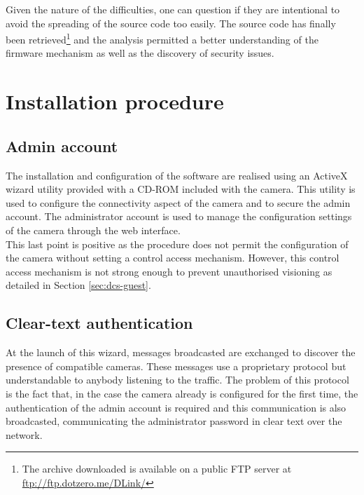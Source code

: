 Given the nature of the difficulties, one can question if they are intentional to avoid the spreading of the source code too easily.
The source code has finally been retrieved\footnote{The archive downloaded is available on a public FTP server at \url{ftp://ftp.dotzero.me/DLink/}} and the analysis permitted a better understanding of the firmware mechanism as well as the discovery of security issues.

\section{Installation procedure}
\label{sec:dcs-install}

\subsection{Admin account}

The installation and configuration of the software are realised using an ActiveX wizard utility provided with a CD-ROM included with the camera.
This utility is used to configure the connectivity aspect of the camera and to secure the admin account.
The administrator account is used to manage the configuration settings of the camera through the web interface.\\

This last point is positive as the procedure does not permit the configuration of the camera without setting a control access mechanism.
However, this control access mechanism is not strong enough to prevent unauthorised visioning as detailed in Section \ref{sec:dcs-guest}.

\subsection{Clear-text authentication}
\label{sec:dcs-clearauth}

At the launch of this wizard, messages broadcasted are exchanged to discover the presence of compatible cameras.
These messages use a proprietary protocol but understandable to anybody listening to the traffic.
The problem of this protocol is the fact that, in the case the camera already is configured for the first time, the authentication of the admin account is required and this communication is also broadcasted, communicating the administrator password in clear text over the network.\\

